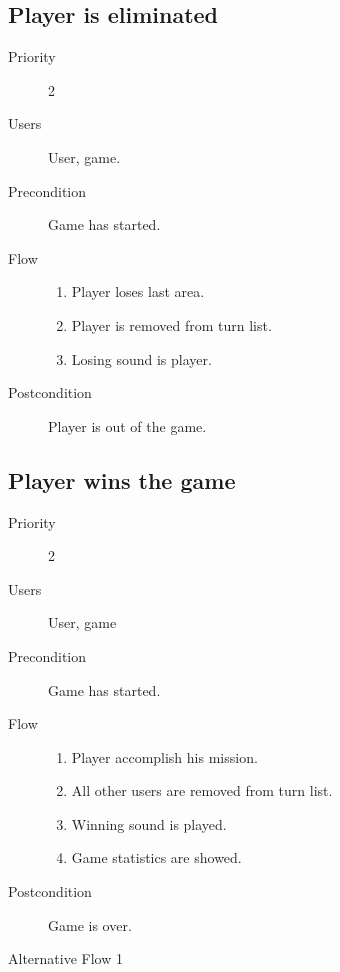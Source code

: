 \documentclass[12pt,a4paper]{article}
\begin{document}
\subsection{Player is eliminated}
\begin{description}
\item[Priority] 2
\item[Users] User, game.
\item[Precondition] Game has started.
\item[Flow]\mbox{}
  \begin{enumerate}
  \item Player loses last area.
  \item Player is removed from turn list.
  \item Losing sound is player.
  \end{enumerate}
\item[Postcondition] Player is out of the game.
\end{description}

\subsection{Player wins the game}
\begin{description}
\item[Priority] 2
\item[Users] User, game
\item[Precondition]  Game has started.
\item[Flow]\mbox{}
  \begin{enumerate}
  \item Player accomplish his mission.
  \item All other users are removed from turn list.
  \item Winning sound is played.
  \item Game statistics are showed.
  \end{enumerate}
\item[Postcondition] Game is over.
\item[Alternative Flow 1]\mbox{}
\end{description}
\end{document}

